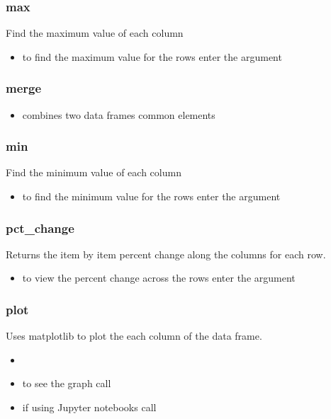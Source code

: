 %
\subsubsection{max}
Find the maximum value of each column
  \begin{itemize}

    \item to find the maximum value for the rows enter the argument
      \color{red}{axis=1}
  \end{itemize}

%
\subsubsection{merge}
  \begin{itemize}
    \item combines two data frames common elements
  \end{itemize}

%
\subsubsection{min}
Find the minimum value of each column
  \begin{itemize}

    \item to find the minimum value for the rows enter the argument
      \color{red}{axis=1}
  \end{itemize}

%
\subsubsection{pct\_change}
Returns the item by item percent change along the columns for each row.
  \begin{itemize}

    \item to view the percent change across the rows enter the argument
      \color{red}{axis=1}
  \end{itemize}

%
\subsubsection{plot}
Uses matplotlib to plot the each column of the data frame.
  \begin{itemize}

    \item {\color{red}{make sure to import matplotlib before calling this
      method}}

    \item to see the graph call {\color{red}{plt.show()}}

    \item if using Jupyter notebooks call {\color{red}{\%matplotlib inline}}
  \end{itemize}

